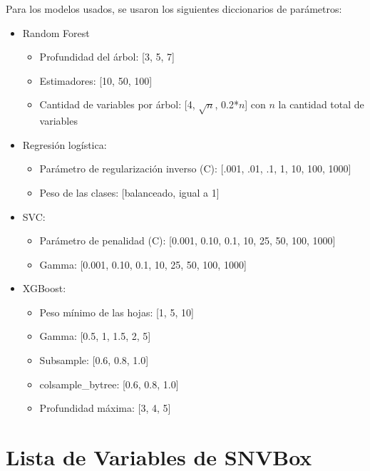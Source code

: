 Para los modelos usados, se usaron los siguientes diccionarios de parámetros:
\begin{itemize}
    \item Random Forest
        \begin{itemize}
            \item Profundidad del árbol: [3, 5, 7]
            \item Estimadores: [10, 50, 100]
            \item Cantidad de variables por árbol: [4, $\sqrt{n}$, 0.2*$n$] con $n$ la cantidad total de variables
        \end{itemize} 
    \item Regresión logística:
        \begin{itemize}
            \item Parámetro de regularización inverso (C): [.001, .01, .1, 1, 10, 100, 1000]
            \item Peso de las clases: [balanceado, igual a 1]
        \end{itemize}
    \item SVC:
        \begin{itemize}
            \item Parámetro de penalidad (C): [0.001, 0.10, 0.1, 10, 25, 50, 100, 1000]
            \item Gamma: [0.001, 0.10, 0.1, 10, 25, 50, 100, 1000]
        \end{itemize}
    \item XGBoost:
        \begin{itemize}
            \item Peso mínimo de las hojas: [1, 5, 10]
            \item Gamma: [0.5, 1, 1.5, 2, 5]
            \item Subsample: [0.6, 0.8, 1.0]
            \item colsample\_bytree: [0.6, 0.8, 1.0]
            \item Profundidad máxima: [3, 4, 5]
        \end{itemize}
\end{itemize}


\section{Lista de Variables de SNVBox}

